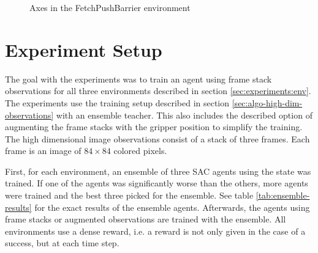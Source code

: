 \begin{figure}[btp]
    \centering
    \caption{Axes in the FetchPushBarrier environment}
    \label{fig:env-axes}
\end{figure}

\section{Experiment Setup}
\label{sec:experiments:setup}

The goal with the experiments was to train an agent using frame stack observations for all three environments described in section \ref{sec:experiments:env}. The experiments use the training setup described in section \ref{sec:algo-high-dim-observations} with an ensemble teacher. This also includes the described option of augmenting the frame stacks with the gripper position to simplify the training. The high dimensional image observations consist of a stack of three frames. Each frame is an image of $84\times84$ colored pixels. 

First, for each environment, an ensemble of three SAC agents using the state was trained. If one of the agents was significantly worse than the others, more agents were trained and the best three picked for the ensemble. See table \ref{tab:ensemble-results} for the exact results of the ensemble agents. Afterwards, the agents using frame stacks or augmented observations are trained with the ensemble. All environments use a dense reward, i.e. a reward is not only given in the case of a success, but at each time step.

